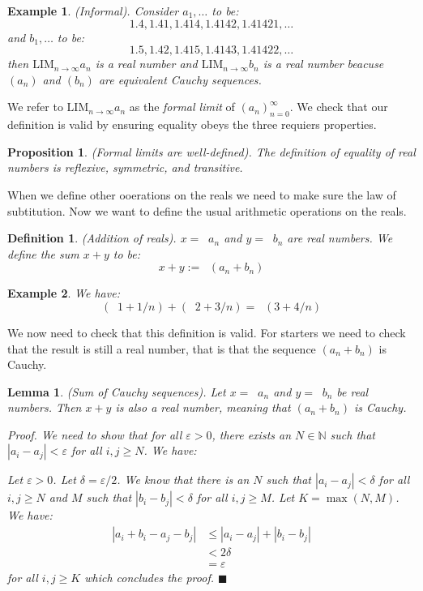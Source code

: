 \documentclass{article}
\newtheorem{example}{Example}[subsection]
\newtheorem{definition}{Definition}[subsection]
\newtheorem{proposition}{Proposition}[subsection]
\newtheorem{lemma}{Lemma}[subsection]
\newcommand{\N}{\mathbb{N}}
\newcommand{\vep}{\varepsilon} %
\newcommand{\LIM}{\mathrm{LIM}}
\DeclareMathOperator{\infLIM}{\mathrm{LIM}_{n \to \infty}}
\let\it\textit
\begin{document}
\begin{example}
	(Informal). Consider $a_1, \dots$ to be:
	$$
	1.4,1.41, 1.414, 1.4142, 1.41421, \dots
	$$
	and $b_1, \dots$ to be:
	$$
	1.5, 1.42, 1.415, 1.4143, 1.41422, \dots
	$$
	then $\LIM_{n\to\infty} a_n$ is a real number 
	and $\LIM_{n\to\infty} b_n$ is a real number
	beacuse $(a_n)$ and $(b_n)$ are
	equivalent Cauchy sequences.
\end{example}

We refer to $\LIM_{n\to\infty} a_n$ as the \it{formal limit} 
of $(a_n)_{n=0}^\infty$.
We check that our definition is valid by ensuring equality 
obeys the three requiers properties.

\begin{proposition}
	(Formal limits are well-defined). The definition of 
	equality of real numbers is reflexive, symmetric, and
	transitive.
\end{proposition}

When we define other ooerations on the reals we need to make 
sure the law of subtitution. Now we want to define the usual
arithmetic operations on the reals.

\begin{definition}
	(Addition of reals). $x = \infLIM a_n$ and
	$y = \infLIM b_n$ are real numbers. We define
	the sum $x+y$ to be:
	$$
	x+y := \infLIM (a_n + b_n)
	$$
\end{definition}

\begin{example}
	We have:
	$$
	(\infLIM 1 + 1/n) + (\infLIM 2 + 3/n) = \infLIM(3 + 4/n)
	$$
\end{example}

We now need to check that this definition is valid. For starters 
we need to check that the result is still a real number, that is 
that the sequence $(a_n + b_n)$ is Cauchy.

\begin{lemma}
	(Sum of Cauchy sequences). Let $x = \infLIM a_n$ and	
	$y = \infLIM b_n$ be real numbers. Then $x+y$ is 
	also a real number, meaning that 
	$(a_n + b_n)$ is Cauchy.

	\it{Proof}. We need to show that for all $\vep > 0$, 
	there exists an $N \in \N$ such that 
	$|a_i - a_j| < \vep$ for all $i,j \geq N$. We have:

	Let $\vep > 0$. Let $\delta = \vep/2$. We know 
	that there is an $N$ such that $|a_i - a_j| < \delta$ 
	for all $i,j \geq N$ and $M$ such that  $|b_i - b_j| < \delta$ for
	all $i,j \geq M$. Let $K = \max(N,M)$. We have: 
	\begin{align*}
		|a_i + b_i - a_j - b_j| &\leq |a_i - a_j| + |b_i - b_j| \\
					&< 2\delta \\
					&= \vep
	\end{align*}
	for all $i,j \geq K$ 
	which concludes the proof. \hfill $\blacksquare$
\end{lemma}
\end{document}
